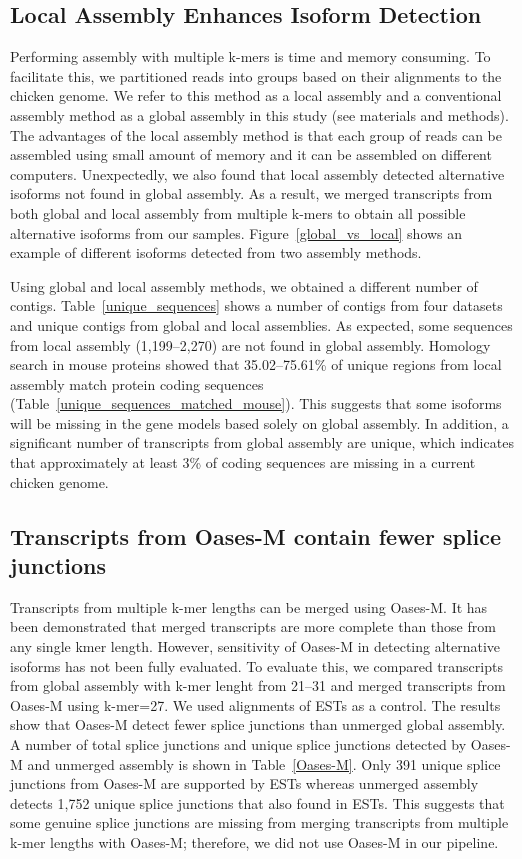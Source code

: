 \documentclass[10pt]{article}
\begin{document}
\subsection*{Local Assembly Enhances Isoform Detection}

Performing assembly with multiple k-mers is time and memory consuming.
To facilitate this, we partitioned reads into groups based on their alignments to the chicken genome.
We refer to this method as a local assembly and a conventional assembly method as a global assembly in this study (see materials and methods).
The advantages of the local assembly method is that each group of reads can be assembled using small amount of memory and it can be assembled on different computers.
Unexpectedly, we also found that local assembly detected alternative isoforms not found in global assembly.
As a result, we merged transcripts from both global and local assembly from multiple k-mers to obtain all possible alternative isoforms from our samples.
Figure~\ref{global_vs_local} shows an example of different isoforms detected from two assembly methods.

Using global and local assembly methods, we obtained a different number of contigs.
Table~\ref{unique_sequences} shows a number of contigs from four datasets and unique contigs from global and local assemblies.
As expected, some sequences from local assembly (1,199--2,270) are not found in global assembly.
Homology search in mouse proteins showed that 35.02--75.61\% of unique regions from local assembly match protein
coding sequences (Table~\ref{unique_sequences_matched_mouse}).
This suggests that some isoforms will be missing in the gene models based solely on global assembly.
In addition, a significant number of transcripts from global assembly are unique, which indicates that
approximately at least 3\% of coding sequences are missing in a current chicken genome.

\subsection*{Transcripts from Oases-M contain fewer splice junctions}
Transcripts from multiple k-mer lengths can be merged using Oases-M.
It has been demonstrated that merged transcripts are more complete than those from any single kmer length\cite{Schulz:2012je}.
However, sensitivity of Oases-M in detecting alternative isoforms has not been fully evaluated.
To evaluate this, we compared transcripts from global assembly with k-mer lenght from 21--31 and merged transcripts from Oases-M using k-mer=27. We used alignments of ESTs as a control.
The results show that Oases-M detect fewer splice junctions than unmerged global assembly.
A number of total splice junctions and unique splice junctions detected by Oases-M and unmerged assembly is
shown in Table~\ref{Oases-M}.
Only 391 unique splice junctions from Oases-M are supported by ESTs whereas unmerged assembly detects 1,752
unique splice junctions that also found in ESTs.
This suggests that some genuine splice junctions are missing from merging transcripts from multiple k-mer
lengths with Oases-M; therefore, we did not use Oases-M in our pipeline.
\end{document}
